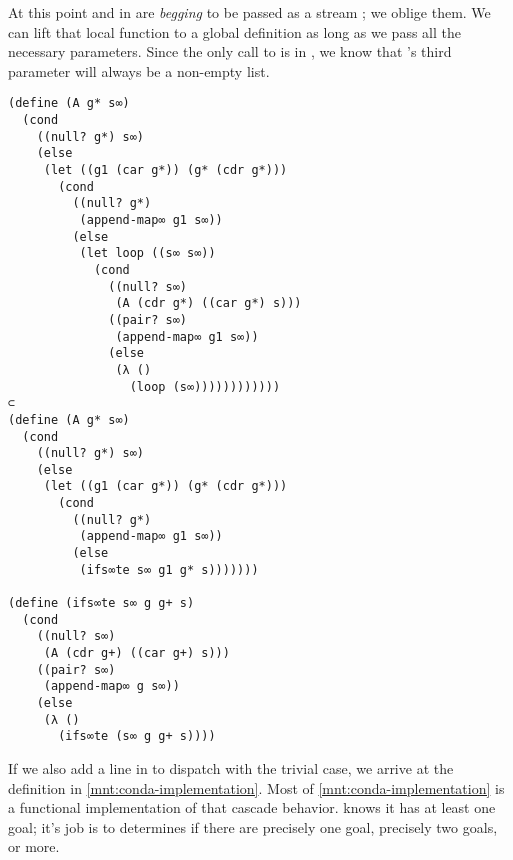 \documentclass[sigplan,balance=true,pbalance=true,natbib=false]{acmart}
\begin{document}
At this point  and  in 
are \emph{begging} to be passed as a stream ; we oblige
them. We can lift that local function  to a global
definition as long as we pass all the necessary parameters. Since the
only call to  is in , we know that
's third parameter will always be a non-empty list.

\begin{verbatim}
(define (A g* s∞)
  (cond
    ((null? g*) s∞)
    (else
     (let ((g1 (car g*)) (g* (cdr g*)))
       (cond
         ((null? g*)
          (append-map∞ g1 s∞))
         (else
          (let loop ((s∞ s∞))
            (cond
              ((null? s∞)
               (A (cdr g*) ((car g*) s)))
              ((pair? s∞)
               (append-map∞ g1 s∞))
              (else
               (λ ()
                 (loop (s∞))))))))))))
⊂
(define (A g* s∞)
  (cond
    ((null? g*) s∞)
    (else
     (let ((g1 (car g*)) (g* (cdr g*)))
       (cond
         ((null? g*)
          (append-map∞ g1 s∞))
         (else
          (ifs∞te s∞ g1 g* s)))))))

(define (ifs∞te s∞ g g+ s)
  (cond
    ((null? s∞)
     (A (cdr g+) ((car g+) s)))
    ((pair? s∞)
     (append-map∞ g s∞))
    (else
     (λ ()
       (ifs∞te (s∞ g g+ s))))
\end{verbatim}

If we also add a line in  to dispatch with the
trivial case, we arrive at the definition in
\cref{mnt:conda-implementation}. Most of
\cref{mnt:conda-implementation} is a functional implementation of that
cascade behavior.  knows it has at least one goal; it's
job is to determines if there are precisely one goal, precisely two
goals, or more.
\end{document}
